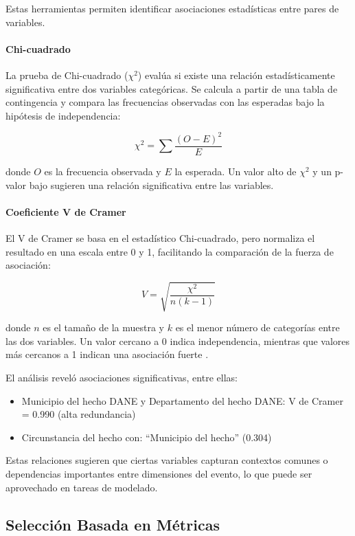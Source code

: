 \documentclass[lettersize,journal]{IEEEtran}
\begin{document}
Estas herramientas permiten identificar asociaciones estadísticas entre pares de variables.

\paragraph{Chi-cuadrado}

La prueba de Chi-cuadrado ($\chi^2$) evalúa si existe una relación estadísticamente significativa entre dos variables categóricas. Se calcula a partir de una tabla de contingencia y compara las frecuencias observadas con las esperadas bajo la hipótesis de independencia:

\[
\chi^2 = \sum \frac{(O - E)^2}{E}
\]

donde $O$ es la frecuencia observada y $E$ la esperada. Un valor alto de $\chi^2$ y un p-valor bajo sugieren una relación significativa entre las variables.

\paragraph{Coeficiente V de Cramer}

El V de Cramer se basa en el estadístico Chi-cuadrado, pero normaliza el resultado en una escala entre 0 y 1, facilitando la comparación de la fuerza de asociación:

\[
V = \sqrt{\frac{\chi^2}{n(k - 1)}}
\]

donde $n$ es el tamaño de la muestra y $k$ es el menor número de categorías entre las dos variables. Un valor cercano a 0 indica independencia, mientras que valores más cercanos a 1 indican una asociación fuerte \cite{backhaus2016multivariate}.

El análisis reveló asociaciones significativas, entre ellas:

\begin{itemize}
    \item Municipio del hecho DANE y Departamento del hecho DANE: V de Cramer = 0.990 (alta redundancia)
    \item Circunstancia del hecho con:
         ``Municipio del hecho'' (0.304)
\end{itemize}

Estas relaciones sugieren que ciertas variables capturan contextos comunes o dependencias importantes entre dimensiones del evento, lo que puede ser aprovechado en tareas de modelado.

\subsection{Selección Basada en Métricas}
\end{document}
